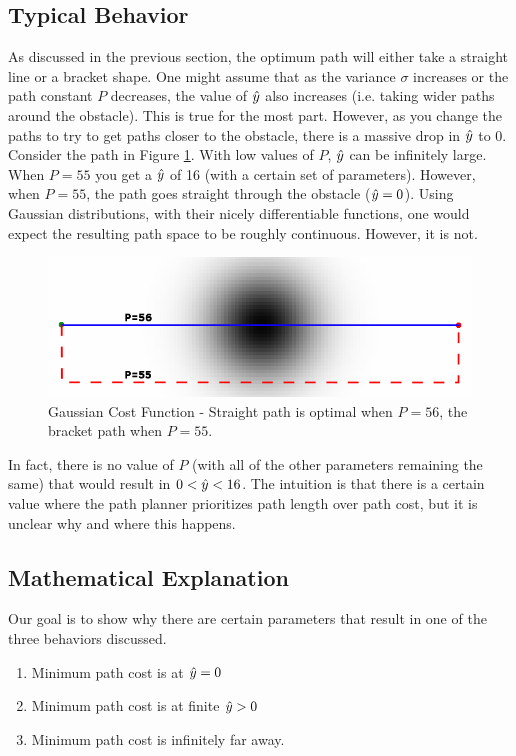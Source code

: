\subsection{Typical Behavior}
As discussed in the previous section, the optimum path will either take a straight line or a bracket shape. One might assume that as the variance $\sigma$ increases or the path constant $P$ decreases, the value of $\hat{y}$ also increases (i.e. taking wider paths around the obstacle). This is true for the most part. However, as you change the paths to try to get paths closer to the obstacle, there is a massive drop in $\hat{y}$ to $0$. Consider the path in Figure \ref{fig:gaussian}. With low values of $P$, $\hat{y}$ can be infinitely large. When $P=55$ you get a $\hat{y}$ of 16 (with a certain set of parameters). However, when $P=55$, the path goes straight through the obstacle ($\hat{y}=0$). Using Gaussian distributions, with their nicely differentiable functions, one would expect the resulting path space to be roughly continuous. However, it is not. 

\begin{figure}
\includegraphics[width=\columnwidth]{graphix/Gaussian.png}
\caption{Gaussian Cost Function - Straight path is optimal when $P=56$, the bracket path when $P=55$. }
\label{fig:gaussian}
\end{figure}

In fact, there is no value of $P$ (with all of the other parameters remaining the same) that would result in $0<\hat{y}<16$. The intuition is that there is a certain value where the path planner prioritizes path length over path cost, but it is unclear why and where this happens. 





\subsection{Mathematical Explanation}
Our goal is to show why there are certain parameters that result in one of the three behaviors discussed. 
\begin{enumerate}
\item Minimum path cost is at $\hat{y}=0$
\item Minimum path cost is at finite $\hat{y}>0$
\item Minimum path cost is infinitely far away. 
\end{enumerate}

